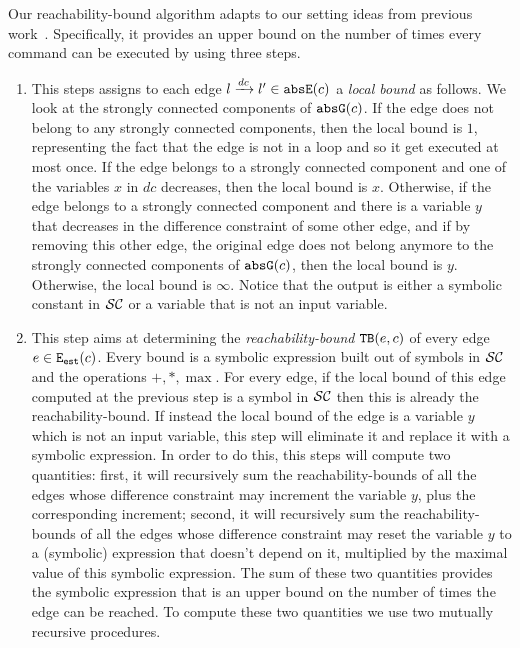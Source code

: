 Our reachability-bound algorithm adapts to our setting ideas from previous work~\cite{ZulegerGSV11,SinnZV14,sinn2017complexity}.
Specifically, it provides an upper bound on the number of times every command can be executed by using three steps.
\begin{enumerate}
\item This steps assigns to each edge  $l \xrightarrow{dc} l'\in \mathtt{abs}{\mathtt{E}}(c)$ a \emph{local bound} as follows. We look at the strongly connected components of $\mathtt{abs}{\mathtt{G}}(c)$. If the edge does not belong to any strongly connected components, then the local bound is $1$, representing the fact that the edge is not in a loop and so it get executed at most once. If the edge belongs to a strongly connected component and one of the variables $x$ in $dc$ decreases, then the local bound is $x$. Otherwise, if the edge belongs to a strongly connected component and there is a variable $y$ that decreases in the difference constraint of some other edge, and if by removing this other edge, the original edge does not belong anymore to the strongly connected components of $\mathtt{abs}{\mathtt{G}}(c)$, then the local bound is $y$. Otherwise, the local bound is $\infty$. Notice that the output is either a symbolic constant in $\mathcal{SC}$ or a variable that is not an input variable.
  
\item This step aims at determining the \emph{reachability-bound} ${\mathtt{TB}}(e, c)$ of every edge $e\in \mathtt{{E_{est}}}(c)$. Every bound is a symbolic expression built out of symbols in $\mathcal{SC}$ and the operations $+, *, \max$. For every edge, if the local bound of this edge computed at the previous step is a symbol in $\mathcal{SC}$ then this is already the reachability-bound. If instead the local bound of the edge is a variable $y$ which is not an input variable, this step will eliminate it and replace it with a symbolic expression. In order to do this, this steps will compute two quantities: first, it will recursively sum the reachability-bounds of all the edges whose difference constraint may increment the variable $y$, plus the corresponding increment; second, it will recursively sum the reachability-bounds of all the edges whose difference constraint may reset the variable $y$ to a (symbolic) expression that doesn't depend on it, multiplied by the maximal value of this symbolic expression. The sum of these two quantities provides the symbolic expression that is an upper bound on the number of times the edge can be reached. To compute these two quantities we use two mutually recursive procedures.
\end{enumerate}
